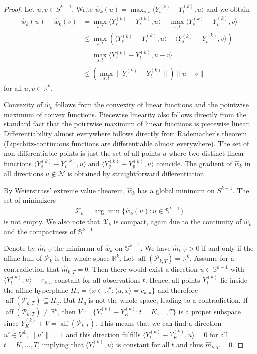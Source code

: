 \begin{proof}
    Let $u,v\in S^{k-1}$. Write $\hat{w}_k(u)=\max_{s,t}\langle Y_s^{(k)}-Y_t^{(k)},u\rangle$ and we obtain
    \begin{align*}
        \hat{w}_k(u)-\hat{w}_k(v)&=\max_{s,t}\langle Y_s^{(k)}-Y_t^{(k)},u\rangle-\max_{s,t}\langle Y_s^{(k)}-Y_t^{(k)},v\rangle\\
        &\le\max_{s,t}\left(\langle Y_s^{(k)}-Y_t^{(k)},u\rangle-\langle Y_s^{(k)}-Y_t^{(k)},v\rangle\right)\\
        &=\max_{s,t}\langle Y_s^{(k)}-Y_t^{(k)},u-v\rangle\\
        &\le\left(\max_{s,t}\|Y_s^{(k)}-Y_t^{(k)}\|\right)\|u-v\|
    \end{align*}
    for all $u,v\in\mathbb{R}^{k}$.

    Convexity of $\hat{w}_k$ follows from the convexity of linear functions and the pointwise maximum of convex functions. Piecewise linearity also follows directly from the standard fact that the pointwise maximum of linear functions is piecewise linear. Differentiability almost everywhere follows directly from Rademacher's theorem (Lipschitz-continuous functions are differentiable almost everywhere). The set of non-differentiable points is just the set of all points $u$ where two distinct linear functions $\langle Y_s^{(k)}-Y_t^{(k)},u\rangle$ and $\langle Y_q^{(k)}-Y_p^{(k)},u\rangle$ coincide. The gradient of $\hat{w}_k$ in all directions $u\notin\mathcal{N}$ is obtained by straightforward differentiation.

    By Weierstrass' extreme value theorem, $\hat{w}_k$ has a global minimum on $S^{k-1}$. The set of minimizers
    \begin{align}\label{eq:set_of_minimizers}
        \mathcal{X}_k=\arg\min\{\hat{w}_k(u):u\in\mathbb{S}^{k-1}\}
    \end{align}
    is not empty. We also note that $\mathcal{X}_k$ is compact, again due to the continuity of $\hat{w}_k$ and the compactness of $\mathbb{S}^{k-1}$. 
    
    Denote by $\hat{m}_{k,T}$ the minimum of $\hat{w}_k$ on $\mathbb{S}^{k-1}$. We have $\hat{m}_{k,T}>0$ if and only if the affine hull of $\mathcal{P}_k$ is the whole space $\mathbb{R}^{k}$. Let $\operatorname{aff}(\mathcal{P}_{k,T})=\mathbb{R}^{k}$. Assume for a contradiction that $\hat{m}_{k,T}=0$. Then there would exist a direction $u\in\mathbb{S}^{k-1}$ with $\langle Y_t^{(k)},u\rangle=c_{k,u}$ constant for all observations $t$. Hence, all points $Y_t^{(k)}$ lie inside the affine hyperplane $H_u=\{x\in\mathbb{R}^{k}:\langle u,x\rangle=c_{k,u}\}$ and therefore $\operatorname{aff}(\mathcal{P}_{k,T})\subseteq H_u$. But $H_u$ is not the whole space, leading to a contradiction. If $\operatorname{aff}(\mathcal{P}_{k,T})\ne\mathbb{R}^{k}$, then $V:=\{Y_t^{(k)}-Y_K^{(k)}:t=K,\dots,T\}$ is a proper subspace since $Y_K^{(k)}+V=\operatorname{aff}(\mathcal{P}_{k,T})$. This means that we can find a direction $u'\in V^{\perp},\|u'\|=1$ and this direction fulfills $\langle Y_t^{(k)}-Y_K^{(k)},u\rangle=0$ for all $t=K,\dots,T$, implying that $\langle Y_t^{(k)},u\rangle$ is constant for all $t$ and thus $\hat{m}_{k,T}=0$.


\end{proof}
